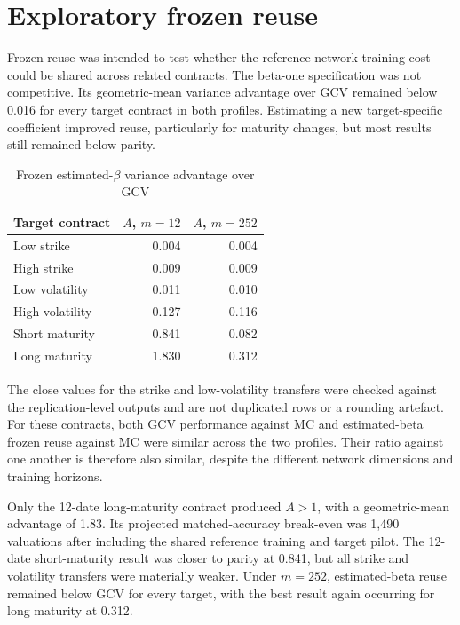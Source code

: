 \section{Exploratory frozen reuse}

Frozen reuse was intended to test whether the reference-network training cost could be shared across related contracts. The beta-one specification was not competitive. Its geometric-mean variance advantage over GCV remained below 0.016 for every target contract in both profiles. Estimating a new target-specific coefficient improved reuse, particularly for maturity changes, but most results still remained below parity.

\begin{table}[htbp]
    \centering
    \caption{Frozen estimated-$\beta$ variance advantage over GCV}
    \label{tab:frozen_reuse}
    \begin{tabular}{lrr}
        \hline
        Target contract & $A$, $m = 12$ & $A$, $m = 252$ \\
        \hline
        Low strike & 0.004 & 0.004 \\
        High strike & 0.009 & 0.009 \\
        Low volatility & 0.011 & 0.010 \\
        High volatility & 0.127 & 0.116 \\
        Short maturity & 0.841 & 0.082 \\
        Long maturity & 1.830 & 0.312 \\
        \hline
    \end{tabular}
\end{table}

The close values for the strike and low-volatility transfers were checked against the replication-level outputs and are not duplicated rows or a rounding artefact. For these contracts, both GCV performance against MC and estimated-beta frozen reuse against MC were similar across the two profiles. Their ratio against one another is therefore also similar, despite the different network dimensions and training horizons.

Only the 12-date long-maturity contract produced $A > 1$, with a geometric-mean advantage of 1.83. Its projected matched-accuracy break-even was 1{,}490 valuations after including the shared reference training and target pilot. The 12-date short-maturity result was closer to parity at 0.841, but all strike and volatility transfers were materially weaker. Under $m = 252$, estimated-beta reuse remained below GCV for every target, with the best result again occurring for long maturity at 0.312.

